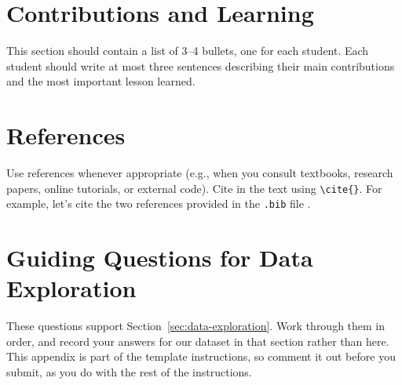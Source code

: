 \documentclass[12pt]{article}
\begin{document}
\section{Contributions and Learning}

This section should contain a list of 3–4 bullets, one for each student. Each student should write at most three sentences describing their main contributions and the most important lesson learned.

\section{References}

Use references whenever appropriate (e.g., when you consult textbooks, research papers, online tutorials, or external code). Cite in the text using \verb|\cite{}|. For example, let's cite the two references provided in the \texttt{.bib} file \cite{bishop2006prml,hastie2009esl}.




\newpage
\appendix
\section{Guiding Questions for Data Exploration}\label{app:data-exploration}

These questions support Section~\ref{sec:data-exploration}. Work through them in order, and record your answers for our dataset in that section rather than here. This appendix is part of the template instructions, so comment it out before you submit, as you do with the rest of the instructions.

%
%
%
\end{document}
